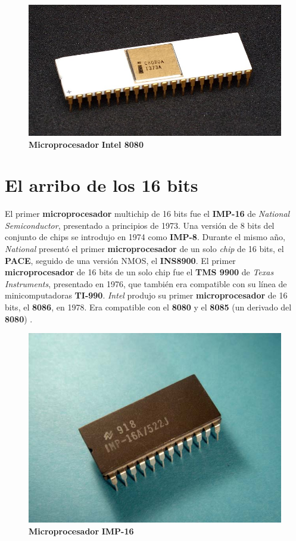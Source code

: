 \begin{figure}[htb]
	\centering
	\includegraphics[scale = 0.2]{Graphics/8080_microprocessorr.jpg}
	\caption{\textbf{Microprocesador} \textbf{Intel 8080}}
	\label{fig:14}
\end{figure}

\section{El arribo de los 16 bits}
El primer \textbf{microprocesador} multichip de 16 bits fue el \textbf{IMP-16} de \emph{National Semiconductor}, presentado a principios de
1973. Una versión de 8 bits del conjunto de chips se introdujo en 1974 como \textbf{IMP-8}. Durante el mismo año, \emph{National} presentó
el primer \textbf{microprocesador} de un solo \emph{chip} de 16 bits, el \textbf{PACE}, seguido de una versión NMOS, el \textbf{INS8900}.
El primer \textbf{microprocesador} de 16 bits de un solo chip fue el \textbf{TMS 9900} de \emph{Texas Instruments}, presentado en 1976, que también
era compatible con su línea de minicomputadoras \textbf{TI-990}. \emph{Intel} produjo su primer \textbf{microprocesador} de 16 bits, el \textbf{8086},
en 1978. Era compatible con el \textbf{8080} y el \textbf{8085} (un derivado del \textbf{8080}) .

\begin{figure}[htb]
	\centering
	\includegraphics[scale = 0.2]{Graphics/NSIMP-16A.jpg}
	\caption{\textbf{Microprocesador} \textbf{IMP-16}}
	\label{fig:15}
\end{figure}


